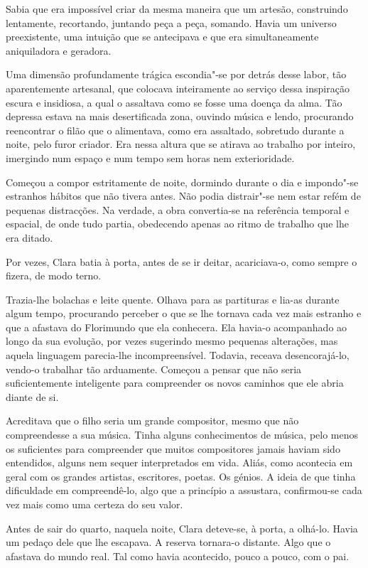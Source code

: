 Sabia que era impossível criar da mesma maneira que um artesão,
construindo lentamente, recortando, juntando peça a peça, somando. Havia
um universo preexistente, uma intuição que se antecipava e que era
simultaneamente aniquiladora e geradora.

Uma dimensão profundamente trágica escondia"-se por detrás desse labor,
tão aparentemente artesanal, que colocava inteiramente ao serviço dessa
inspiração escura e insidiosa, a qual o assaltava como se fosse uma
doença da alma. Tão depressa estava na mais desertificada zona, ouvindo
música e lendo, procurando reencontrar o filão que o alimentava, como
era assaltado, sobretudo durante a noite, pelo furor criador. Era nessa
altura que se atirava ao trabalho por inteiro, imergindo num espaço e
num tempo sem horas nem exterioridade.

Começou a compor estritamente de noite, dormindo durante o dia e
impondo"-se estranhos hábitos que não tivera antes. Não podia distrair"-se
nem estar refém de pequenas distracções. Na verdade, a obra convertia-se
na referência temporal e espacial, de onde tudo partia, obedecendo
apenas ao ritmo de trabalho que lhe era ditado.

Por vezes, Clara batia à porta, antes de se ir deitar, acariciava-o,
como sempre o fizera, de modo terno.

Trazia-lhe bolachas e leite quente. Olhava para as partituras e lia-as
durante algum tempo, procurando perceber o que se lhe tornava cada vez
mais estranho e que a afastava do Florimundo que ela conhecera. Ela
havia-o acompanhado ao longo da sua evolução, por vezes sugerindo mesmo
pequenas alterações, mas aquela linguagem parecia-lhe incompreensível.
Todavia, receava desencorajá-lo, vendo-o trabalhar tão arduamente.
Começou a pensar que não seria suficientemente inteligente para
compreender os novos caminhos que ele abria diante de si.

Acreditava que o filho seria um grande compositor, mesmo que não
compreendesse a sua música. Tinha alguns conhecimentos de música, pelo
menos os suficientes para compreender que muitos compositores jamais
haviam sido entendidos, alguns nem sequer interpretados em vida. Aliás,
como acontecia em geral com os grandes artistas, escritores, poetas. Os
génios. A ideia de que tinha dificuldade em compreendê-lo, algo que a
princípio a assustara, confirmou-se cada vez mais como uma certeza do
seu valor.

Antes de sair do quarto, naquela noite, Clara deteve-se, à porta, a
olhá-lo. Havia um pedaço dele que lhe escapava. A reserva tornara-o
distante. Algo que o afastava do mundo real. Tal como havia acontecido,
pouco a pouco, com o pai.

